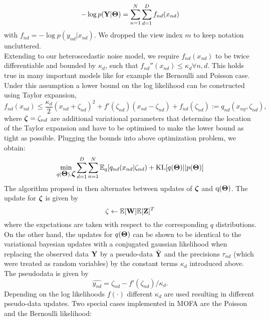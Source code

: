 \documentclass[10pt, a4paper,openany]{report}
\begin{document}
\[
-\log p({\bf Y}|\mbox{\boldmath $\Theta$}) = \sum_{n=1}^{N} \sum_{d=1}^{D} f_{nd} (x_{nd})
\]
with $f_{nd} = -\log p(y_{nd}|x_{nd})$. We dropped the view index $m$ to keep notation uncluttered.\\
Extending \cite{seeger} to our heteroscedastic noise model, we require $f_{nd}(x_{nd})$ to be twice differentiable and bounded by $\kappa_d$, such that $f_{nd}''(x_{nd}) \leq \kappa_d \forall n,d$. This holds true in many important models like for example the Bernoulli and Poisson case. Under this assumption a lower bound on the log likelihood can be constructed using Taylor expansion,
\[
f_{nd}(x_{nd}) \leq \frac{\kappa_d}{2} (x_{nd} + \zeta_{nd})^2 + f'(\zeta_{nd})(x_{nd} - \zeta_{nd}) + f_{nd}(\zeta_{nd}) := q_{nd}(x_{ng},\zeta_{nd}),
\]
where $\mbox{\boldmath $\zeta$} =  \zeta_{nd} $ are additional variational parameters that determine the location of the Taylor expansion and have to be optimised to make the lower bound as tight as possible. Plugging the bounds into above optimization problem, we obtain:
\[
\min_{q(\mbox{\boldmath $\Theta$}),\mbox{\boldmath $\zeta$}} \sum_{d=1}^{D}\sum_{n=1}^{N} \mathbb{E}_q [ q_{nd}(x_{nd}|\zeta_{nd}) + {\rm KL}[q(\mbox{\boldmath $\Theta$})||p(\mbox{\boldmath $\Theta$})]
\]
The algorithm propsed in \cite{seeger} then alternates between updates of $\mbox{\boldmath $\zeta$}$ and $\mathrm{q}(\mbox{\boldmath $\Theta$})$. The update for $\mbox{\boldmath $\zeta$}$ is given by
\[
\zeta \leftarrow \mathbb{E}[{\bf W}]\mathbb{E}[{\bf Z}]^{T}
\]
where the expctations are taken with respect to the corresponding $q$ distributions.\\
On the other hand, the updates for $q(\mbox{\boldmath $\Theta$})$ can be shown to be identical to the variational bayesian updates with a conjugated gaussian likelihood when replacing the observed data ${\bf Y}$ by a pseudo-data $\hat{{\bf Y}}$ and the precisions $\tau_{nd}$ (which were treated as random variables) by the constant terms $\kappa_d$ introduced above.\\
The pseudodata is given by
\[
\hat{y_{nd}} = \zeta_{nd} - f'(\zeta_{nd})/\kappa_d.
\]
Depending on the log likelihoods $f(·)$ different $\kappa_d$ are used resulting in different pseudo-data updates. Two special cases implemented in MOFA are the Poisson and the Bernoulli likelihood:
\end{document}
